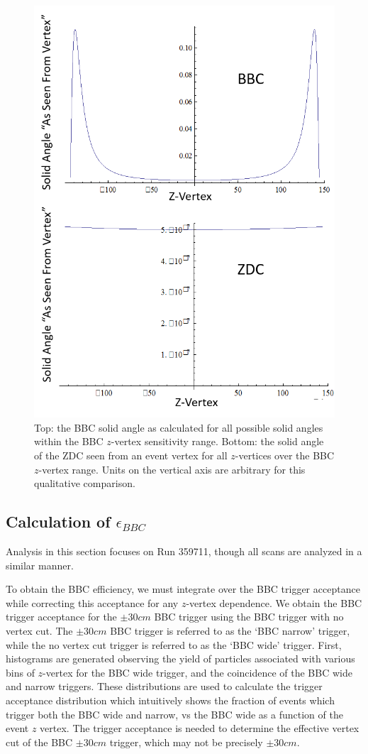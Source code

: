 \begin{figure}
  \centering
  \includegraphics[width=0.8\linewidth]{./figures/solid_angle_compare.png}
  \caption{
    Top: the BBC solid angle as calculated for all possible solid angles within
    the BBC $z$-vertex sensitivity range. Bottom: the solid angle of the ZDC
    seen from an event vertex for all $z$-vertices over the BBC $z$-vertex
    range. Units on the vertical axis are arbitrary for this qualitative
    comparison.
  }
  \label{fig:solid_angle_compare}
\end{figure}

\clearpage
\subsection{Calculation of $\epsilon_{BBC}$}

Analysis in this section focuses on Run 359711, though all scans are analyzed in
a similar manner.

To obtain the BBC efficiency, we must integrate over the BBC trigger acceptance
while correcting this acceptance for any $z$-vertex dependence. We obtain the
BBC trigger acceptance for the $\pm30cm$ BBC trigger using the BBC trigger with
no vertex cut. The $\pm30cm$ BBC trigger is referred to as the `BBC narrow'
trigger, while the no vertex cut trigger is referred to as the `BBC wide'
trigger. First, histograms are generated observing the yield of particles
associated with various bins of $z$-vertex for the BBC wide trigger, and the
coincidence of the  BBC wide and narrow triggers.  These distributions are used
to calculate the trigger acceptance distribution which intuitively shows the
fraction of events which trigger both the BBC wide and narrow, vs the BBC wide
as a function of the event $z$ vertex.  The trigger acceptance is needed to
determine the effective vertex cut of the BBC $\pm30cm$ trigger, which may not
be precisely $\pm30cm$.

